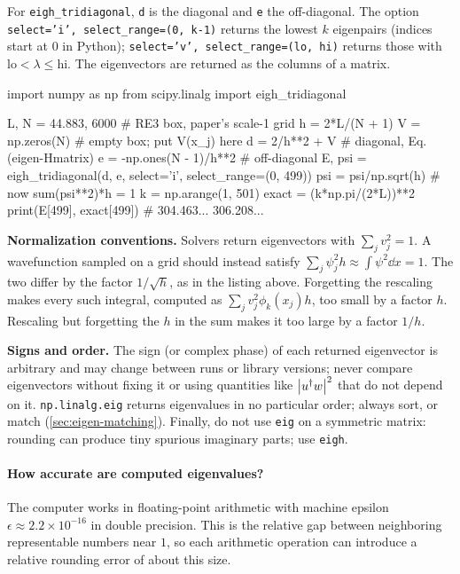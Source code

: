 For \texttt{eigh\_tridiagonal}, \texttt{d} is the diagonal and \texttt{e} the off-diagonal. The option \texttt{select='i', select\_range=(0, k-1)} returns the lowest $k$ eigenpairs (indices start at 0 in Python); \texttt{select='v', select\_range=(lo, hi)} returns those with $\text{lo}<\lambda\le\text{hi}$. The eigenvectors are returned as the columns of a matrix.

\begin{pycode}
import numpy as np
from scipy.linalg import eigh_tridiagonal

L, N = 44.883, 6000                     # RE3 box, paper's scale-1 grid
h = 2*L/(N + 1)
V = np.zeros(N)                         # empty box; put V(x_j) here
d = 2/h**2 + V                          # diagonal, Eq. (eigen-Hmatrix)
e = -np.ones(N - 1)/h**2                # off-diagonal
E, psi = eigh_tridiagonal(d, e, select='i', select_range=(0, 499))
psi = psi/np.sqrt(h)                    # now sum(psi**2)*h = 1
k = np.arange(1, 501)
exact = (k*np.pi/(2*L))**2
print(E[499], exact[499])               # 304.463...  306.208...
\end{pycode}

\begin{pitfall}
\textbf{Normalization conventions.} Solvers return eigenvectors with $\sum_j v_j^2=1$. A wavefunction sampled on a grid should instead satisfy $\sum_j\psi_j^2h\approx\int\psi^2\dd x=1$. The two differ by the factor $1/\sqrt h$, as in the listing above. Forgetting the rescaling makes every such integral, computed as $\sum_jv_j^2\phi_k(x_j)h$, too small by a factor $h$. Rescaling but forgetting the $h$ in the sum makes it too large by a factor $1/h$.
\end{pitfall}

\begin{pitfall}
\textbf{Signs and order.} The sign (or complex phase) of each returned eigenvector is arbitrary and may change between runs or library versions; never compare eigenvectors without fixing it or using quantities like $\left\lvert u^\dagger w\right\rvert^2$ that do not depend on it. \texttt{np.linalg.eig} returns eigenvalues in no particular order; always sort, or match (\cref{sec:eigen-matching}). Finally, do not use \texttt{eig} on a symmetric matrix: rounding can produce tiny spurious imaginary parts; use \texttt{eigh}.
\end{pitfall}

\paragraph{How accurate are computed eigenvalues?} The computer works in floating-point arithmetic with machine epsilon $\epsilon\approx2.2\times10^{-16}$ in double precision. This is the relative gap between neighboring representable numbers near $1$, so each arithmetic operation can introduce a relative rounding error of about this size.

